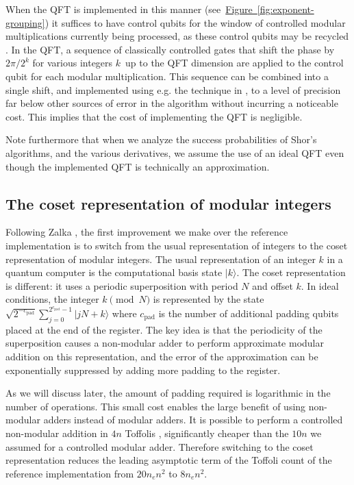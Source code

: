\documentclass[superscriptaddress,notitlepage,longbibliography]{revtex4-1}
\theoremstyle{definition}
\theoremstyle{definition}
\newcommand{\fig}[1]{\hyperref[fig:#1]{Figure~\ref*{fig:#1}}}
\newcommand{\lenexp}{{n_e}}
\newcommand{\gpad}{{c_{\text{pad}}}}
\begin{document}
When the QFT is implemented in this manner (see~\fig{exponent-grouping}) it suffices to have control qubits for the window of controlled modular multiplications currently being processed, as these control qubits may be recycled \cite{mosca1999recycle, parker2000recycle}. In the QFT, a sequence of classically controlled gates that shift the phase by $2\pi/2^k$ for various integers $k$ up to the QFT dimension are applied to the control qubit for each modular multiplication.
This sequence can be combined into a single shift, and implemented using e.g. the technique in \cite{bocharov2015rus}, to a level of precision far below other sources of error in the algorithm without incurring a noticeable cost. This implies that the cost of implementing the QFT is negligible.

Note furthermore that when we analyze the success probabilities of Shor's algorithms, and the various derivatives, we assume the use of an ideal QFT even though the implemented QFT is technically an approximation.

\subsection{The coset representation of modular integers}

Following Zalka \cite{zalka2006pure}, the first improvement we make over the reference implementation is to switch from the usual representation of integers to the coset representation of modular integers.
The usual representation of an integer $k$ in a quantum computer is the computational basis state $|k\rangle$.
The coset representation is different: it uses a periodic superposition with period $N$ and offset $k$.
In ideal conditions, the integer $k \pmod{N}$ is represented by the state $\sqrt{2^{-\gpad}} \sum_{j=0}^{2^\gpad-1} |jN + k\rangle$ where $\gpad$ is the number of additional padding qubits placed at the end of the register.
The key idea is that the periodicity of the superposition causes a non-modular adder to perform approximate modular addition on this representation, and the error of the approximation can be exponentially suppressed by adding more padding to the register.

As we will discuss later, the amount of padding required is logarithmic in the number of operations.
This small cost enables the large benefit of using non-modular adders instead of modular adders.
It is possible to perform a controlled non-modular addition in $4n$ Toffolis \cite{cuccaro2004adder, gidney2018addition}, significantly cheaper than the $10n$ we assumed for a controlled modular adder.
Therefore switching to the coset representation reduces the leading asymptotic term of the Toffoli count of the reference implementation from $20 \lenexp n^2$ to $8 \lenexp n^2$.
\end{document}
